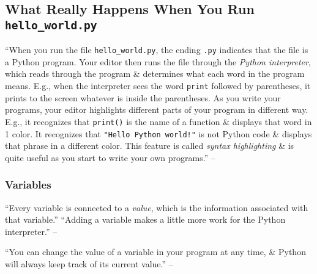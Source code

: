 \documentclass[oneside]{book}
\numberwithin{equation}{section}
\begin{document}
\subsection{What Really Happens When You Run \texttt{hello\_world.py}}
``When you run the file \verb|hello_world.py|, the ending \texttt{.py} indicates that the file is a Python program. Your editor then runs the file through the \textit{Python interpreter}, which reads through the program \& determines what each word in the program means. E.g., when the interpreter sees the word \texttt{print} followed by parentheses, it prints to the screen whatever is inside the parentheses. As you write your programs, your editor highlights different parts of your program in different way. E.g., it recognizes that \texttt{print()} is the name of a function \& displays that word in 1 color. It recognizes that \texttt{"Hello Python world!"} is not Python code \& displays that phrase in a different color. This feature is called \textit{syntax highlighting} \& is quite useful as you start to write your own programs.'' -- \cite[p. 16]{Matthes2019}

\subsubsection{Variables}
``Every variable is connected to a \textit{value}, which is the information associated with that variable.'' ``Adding a variable makes a little more work for the Python interpreter.'' -- \cite[p. 16]{Matthes2019}

``You can change the value of a variable in your program at any time, \& Python will always keep track of its current value.'' -- \cite[p. 17]{Matthes2019}
\end{document}
